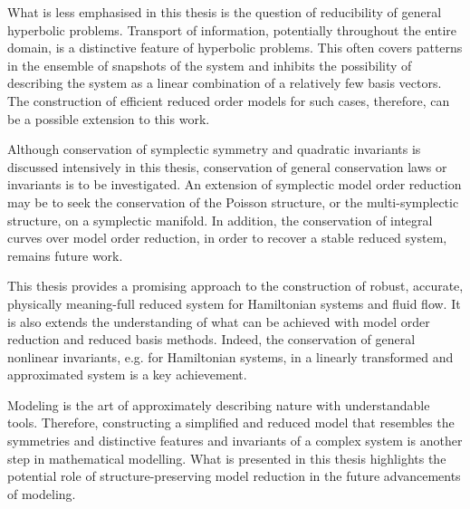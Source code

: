 What is less emphasised in this thesis is the question of reducibility of general hyperbolic problems. Transport of information, potentially throughout the entire domain, is a distinctive feature of hyperbolic problems. This often covers patterns in the ensemble of snapshots of the system and inhibits the possibility of describing the system as a linear combination of a relatively few basis vectors. The construction of efficient reduced order models for such cases, therefore, can be a possible extension to this work.

Although conservation of symplectic symmetry and quadratic invariants is discussed intensively in this thesis, conservation of general conservation laws or invariants is to be investigated. An extension of symplectic model order reduction may be to seek the conservation of the Poisson structure, or the multi-symplectic structure, on a symplectic manifold. In addition, the conservation of integral curves over model order reduction, in order to recover a stable reduced system, remains future work.

This thesis provides a promising approach to the construction of robust, accurate, physically meaning-full reduced system for Hamiltonian systems and fluid flow. It is also extends the understanding of what can be achieved with model order reduction and reduced basis methods. Indeed, the conservation of general nonlinear invariants, e.g. for Hamiltonian systems, in a linearly transformed and approximated system is a key achievement. 

Modeling is the art of approximately describing nature with understandable tools. Therefore, constructing a simplified and reduced model that resembles the symmetries and distinctive features and invariants of a complex system is another step in mathematical modelling. What is presented in this thesis highlights the potential role of structure-preserving model reduction in the future advancements of modeling.
